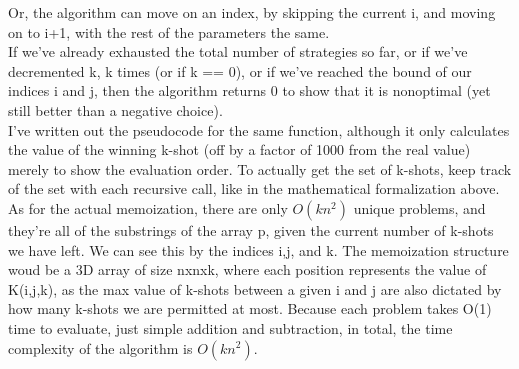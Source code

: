 \begin{enumerate}
  Or, the algorithm can move on an index, by skipping the current i, and moving on to i+1, with the rest of the parameters the same.\\

  If we've already exhausted the total number of strategies so far, or if we've decremented k, k times (or if k == 0), or if we've reached the bound of our indices i and j, then the algorithm returns 0 to show that it is nonoptimal (yet still better than a negative choice).\\

  I've written out the pseudocode for the same function, although it only calculates the value of the winning k-shot (off by a factor of 1000 from the real value) merely to show the evaluation order. To actually get the set of k-shots, keep track of the set with each recursive call, like in the mathematical formalization above.\\

  As for the actual memoization, there are only $O(kn^2)$ unique problems, and they're all of the substrings of the array p, given the current number of k-shots we have left. We can see this by the indices i,j, and k. The memoization structure woud be a 3D array of size nxnxk, where each position represents the value of K(i,j,k), as the max value of k-shots between a given i and j are also dictated by how many k-shots we are permitted at most. Because each problem takes O(1) time to evaluate, just simple addition and subtraction, in total, the time complexity of the algorithm is $O(kn^2)$.
  

\end{enumerate}
